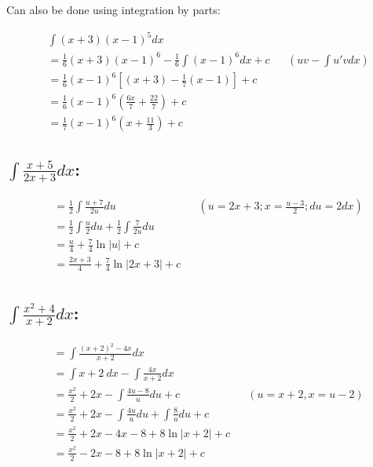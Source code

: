\documentclass[MathsNotesBase.tex]{subfiles}
\begin{document}
  \bigskip
  Can also be done using integration by parts:
  
  \begin{align*}
      &\int{(x+3)(x - 1)^5}dx && \\
      &= \frac{1}{6}(x+3)(x-1)^6 - \frac{1}{6}\int{(x-1)^6}dx + c && (uv - \int{u'v}dx)\\
      &= \frac{1}{6}(x-1)^6\left[(x+3) - \frac{1}{7}(x-1)\right] + c && \\[8pt]
      &= \frac{1}{6}(x-1)^6\left(\frac{6x}{7}+\frac{22}{7}\right) + c && \\[8pt]
      &= \frac{1}{7}(x-1)^6(x+\frac{11}{3}) + c
  \end{align*}
  
  \bigskip\bigskip\bigskip
  
  \subsection*{$\int{\frac{x+5}{2x+3}}dx$:}
   
  \begin{align*}
      &= \frac{1}{2}\int{\frac{u + 7}{2u}}du && (u = 2x + 3; x = \frac{u - 3}{2}; du = 2dx)\\
      &= \frac{1}{2}\int{\frac{u}{2}}du + \frac{1}{2}\int{\frac{7}{2u}}du && \\[8pt]
      &= \frac{u}{4}+\frac{7}{4}\ln\lvert{u}\rvert + c && \\[8pt]
      &= \frac{2x + 3}{4} + \frac{7}{4}\ln\lvert{2x + 3}\rvert + c && \\[8pt]
  \end{align*}
  
  
  \subsection*{$\int{\frac{x^2 + 4}{x + 2}}dx$:}
   
  \begin{align*}
      &= \int{\frac{(x + 2)^2 - 4x}{x + 2}}dx && \\
      &= \int{x + 2}\ dx - \int{\frac{4x}{x + 2}}dx && \\[8pt]
      &= \frac{x^2}{2} + 2x -  \int{\frac{4u - 8}{u}}du + c && (u = x + 2, x = u - 2)\\[8pt]
      &= \frac{x^2}{2} + 2x - \int{\frac{4u}{u}}du + \int{\frac{8}{u}}du + c && \\[8pt]
      &= \frac{x^2}{2} + 2x - 4x - 8 + 8\ln\rvert{x + 2}\rvert + c \\
      &= \frac{x^2}{2} - 2x - 8 + 8\ln\rvert{x + 2}\rvert + c
  \end{align*}
  
\end{document}
